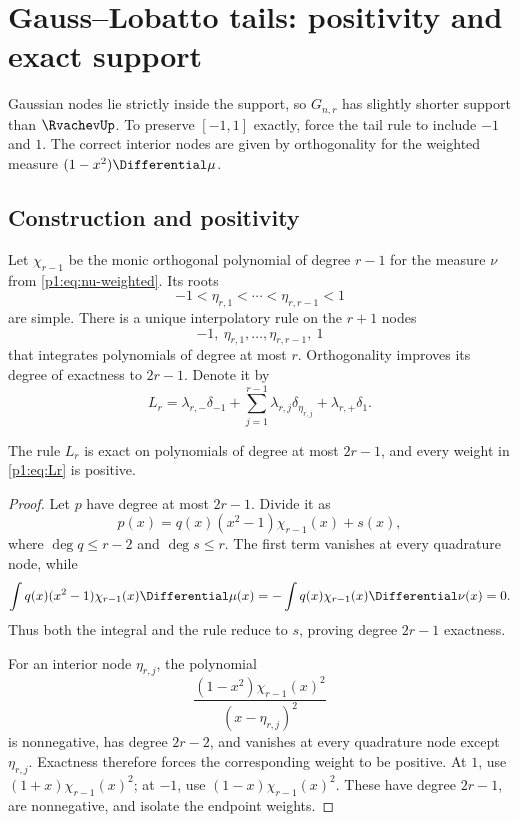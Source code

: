 \documentclass[11pt]{article}
\numberwithin{equation}{section}
\theoremstyle{definition}
\theoremstyle{remark}
\begin{document}
\section{Gauss--Lobatto tails: positivity and exact support}
\label{p1:sec:lobatto}

Gaussian nodes lie strictly inside the support, so $G_{n,r}$ has slightly shorter support than $\RvachevUp$.  To preserve $[-1,1]$ exactly, force the tail rule to include $-1$ and $1$.  The correct interior nodes are given by orthogonality for the weighted measure $(1-x^2)\Differential\mu$.

\subsection{Construction and positivity}

Let $\chi_{r-1}$ be the monic orthogonal polynomial of degree $r-1$ for the measure $\nu$ from \eqref{p1:eq:nu-weighted}.  Its roots
\begin{equation}
 -1<\eta_{r,1}<\cdots<\eta_{r,r-1}<1
 \label{p1:eq:L-interior-nodes}
\end{equation}
are simple.  There is a unique interpolatory rule on the $r+1$ nodes
\begin{equation}
 -1,\ \eta_{r,1},\ldots,\eta_{r,r-1},\ 1
 \label{p1:eq:L-nodes}
\end{equation}
that integrates polynomials of degree at most $r$.  Orthogonality improves its degree of exactness to $2r-1$.  Denote it by
\begin{equation}
 L_r=\lambda_{r,-}\delta_{-1}
 +\sum_{j=1}^{r-1}\lambda_{r,j}\delta_{\eta_{r,j}}
 +\lambda_{r,+}\delta_1.
 \label{p1:eq:Lr}
\end{equation}

\begin{proposition}
\label{p1:prop:L-exact-positive}
The rule $L_r$ is exact on polynomials of degree at most $2r-1$, and every weight in \eqref{p1:eq:Lr} is positive.
\end{proposition}

\begin{proof}
Let $p$ have degree at most $2r-1$.  Divide it as
\[
 p(x)=q(x)(x^2-1)\chi_{r-1}(x)+s(x),
 \]
where $\deg q\le r-2$ and $\deg s\le r$.  The first term vanishes at every quadrature node, while
\[
 \int q(x)(x^2-1)\chi_{r-1}(x)\Differential\mu(x)
 =-\int q(x)\chi_{r-1}(x)\Differential\nu(x)=0.
\]
Thus both the integral and the rule reduce to $s$, proving degree $2r-1$ exactness.

For an interior node $\eta_{r,j}$, the polynomial
\[
 \frac{(1-x^2)\chi_{r-1}(x)^2}{(x-\eta_{r,j})^2}
\]
is nonnegative, has degree $2r-2$, and vanishes at every quadrature node except $\eta_{r,j}$.  Exactness therefore forces the corresponding weight to be positive.  At $1$, use $(1+x)\chi_{r-1}(x)^2$; at $-1$, use $(1-x)\chi_{r-1}(x)^2$.  These have degree $2r-1$, are nonnegative, and isolate the endpoint weights.
\end{proof}
\end{document}
